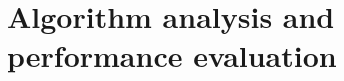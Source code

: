 \documentclass[a4paper,english,numberwithinsect,notab]{eurocg20-submission}
\begin{document}
	
	
	
	


\section{Algorithm analysis and performance evaluation}
\label{sec:algorithm-analysis-and-performance-evaluation}
\end{document}
